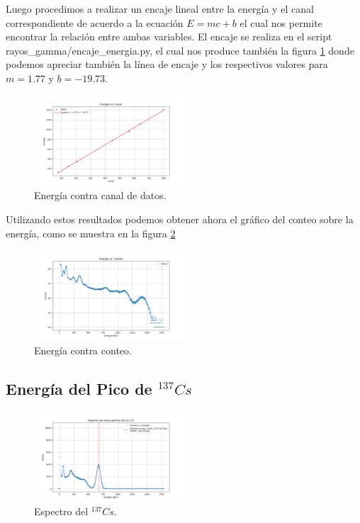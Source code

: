 \documentclass[twocolumn,a4paper,11pt]{scrartcl}
\begin{document}
Luego procedimos a realizar un encaje lineal entre la energía y el canal correspondiente de acuerdo a la ecuación $E = mc +b$ el cual nos permite encontrar la relación entre ambas variables. El encaje se realiza en el script rayos\_gamma/encaje\_energia.py, el cual nos produce también la figura \ref{fig:energia_canal_graph} donde podemos apreciar también la línea de encaje y los respectivos valores para $m = 1.77$ y $b = -19.73$.

\begin{figure}[]
  \includegraphics[width=0.50\textwidth]{energy_vs_canal.png}
  \caption{Energía contra canal de datos.}
  \label{fig:energia_canal_graph}
\end{figure}

Utilizando estos resultados podemos obtener ahora el gráfico del conteo sobre la energía, como se muestra en la figura \ref{fig:energia_conteo_graph} 

\begin{figure}[]
  \includegraphics[width=0.50\textwidth]{energia_vs_conteo_eu-152.png}
  \caption{Energía contra conteo.}
  \label{fig:energia_conteo_graph}
\end{figure}

\subsection*{Energía del Pico de $^{137}Cs$}

\begin{figure}[]
  \includegraphics[width=0.50\textwidth]{plot_cs137.png}
  \caption{Espectro del $^{137}Cs$.}
  \label{fig:espectro_cs}
\end{figure}
\end{document}
